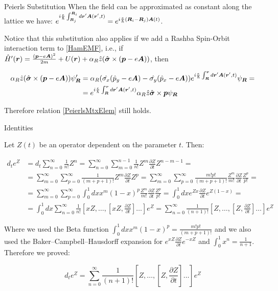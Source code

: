 \begin{subappendices}
\begin{section}{Peierls Substitution}
When the field can be approximated as constant along the lattice we have: $e^{i\frac{e}{\hbar}\int_{\boldsymbol{R}_j}^{\boldsymbol{R}_i} d\boldsymbol{r}'\boldsymbol{A}(\boldsymbol{r}',t)} = e^{i\frac{e}{\hbar} (\boldsymbol{R}_i-\boldsymbol{R}_j) \boldsymbol{A}(t)}$.

Notice that this substitution also applies if we add a Rashba Spin-Orbit interaction term to \ref{HamEMF}, i.e., if $\hat{H}'(\boldsymbol{r}) = \frac{(\boldsymbol{p}-e\boldsymbol{A})^2}{2m} +U(\boldsymbol{r}) + \alpha_R \hat{z}(\hat{\boldsymbol{\sigma}} \times (\boldsymbol{p}-e\boldsymbol{A}))$, then

\begin{align*}
  \alpha_R \hat{z}(\hat{\boldsymbol{\sigma}} \times (\boldsymbol{p}-e\boldsymbol{A})) \psi'_{\boldsymbol{R}} &= \alpha_R(\hat{\sigma_x}(\hat{p}_y-e\boldsymbol{A}) - \hat{\sigma_y}(\hat{p}_x-e\boldsymbol{A})) e^{i\frac{e}{\hbar}\int_{\boldsymbol{R}}^{\boldsymbol{r}}d\boldsymbol{r}'\boldsymbol{A}(\boldsymbol{r}',t)} \psi_{\boldsymbol{R}} = \\
  &= e^{i\frac{e}{\hbar}\int_{\boldsymbol{R}}^{\boldsymbol{r}}d\boldsymbol{r}'\boldsymbol{A}(\boldsymbol{r}',t)} \alpha_R \hat{z}\hat{\boldsymbol{\sigma}} \times \boldsymbol{p} \psi_{\boldsymbol{R}}
\end{align*}

Therefore relation \ref{PeierlsMtxElem} still holds.

\end{section}

\begin{section}{Identities}

Let $Z(t)$ be an operator dependent on the parameter $t$. Then:

\begin{align*}
d_t e^{Z} &= d_t \sum_{n=0}^\infty \frac{1}{n!} Z^n = \sum_{n=0}^\infty \sum_{m=0}^{n-1} \frac{1}{n!} Z^m \frac{\partial Z}{\partial t} Z^{n-m-1} = \\
&= \sum_{m=0}^\infty \sum_{p=0}^\infty \frac{1}{(m+p+1)!}Z^m \frac{\partial Z}{\partial t} Z^p = \sum_{m=0}^\infty \sum_{p=0}^\infty \frac{m!p!}{(m+p+1)!} \frac{Z^m}{m!} \frac{\partial Z}{\partial t} \frac{Z^p}{p!} =\\
&= \sum_{m=0}^\infty \sum_{p=0}^\infty \int_0^1 dx x^m (1-x)^p \frac{Z^m}{m!} \frac{\partial Z}{\partial t} \frac{Z^p}{p!} = \int_0^1 dx e^{Zx} \frac{\partial Z}{\partial t} e^{Z(1-x)} = \\
&= \int_0^1 dx \sum_{n=0}^\infty \frac{1}{n!} \left[xZ, \dots, \left[xZ, \frac{\partial Z}{\partial t}\right] \dots \right] e^Z = \sum_{n=0}^\infty \frac{1}{(n+1)!} \left[Z, \dots, \left[Z, \frac{\partial Z}{\partial t}\right] \dots \right] e^Z
\end{align*}

Where we used the Beta function $\int_0^1 dx x^m (1-x)^p = \frac{m!p!}{(m+p+1)!}$ and we also used the Baker–Campbell–Hausdorff expansion for $e^{xZ}\frac{\partial Z}{\partial t}e^{-xZ}$ and $\int_0^1 x^n = \frac{1}{n+1}$. Therefore we proved:

\begin{equation}
d_t e^{Z} = \sum_{n=0}^\infty \frac{1}{(n+1)!} \left[Z, \dots, \left[Z, \frac{\partial Z}{\partial t}\right] \dots \right] e^Z
\end{equation}

\end{section}

\end{subappendices}







